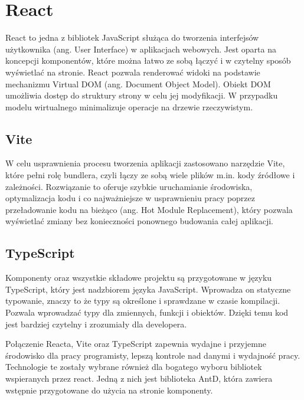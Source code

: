 \section{React}
React to jedna z bibliotek JavaScript służąca do tworzenia interfejsów użytkownika (ang. User Interface) w aplikacjach webowych. Jest oparta na koncepcji komponentów, które można łatwo ze sobą łączyć i w czytelny sposób wyświetlać na stronie. React pozwala renderować widoki na podstawie mechanizmu Virtual DOM (ang. Document Object Model). Obiekt DOM umożliwia dostęp do struktury strony w celu jej modyfikacji. W przypadku modelu wirtualnego minimalizuje operacje na drzewie rzeczywistym. 
\subsection*{Vite}
W celu usprawnienia procesu tworzenia aplikacji zastosowano narzędzie Vite, które pełni rolę bundlera, czyli łączy ze sobą wiele plików m.in. kody źródłowe i zależności. Rozwiązanie to oferuje szybkie uruchamianie środowiska, optymalizacja kodu i co najważniejsze w usprawnieniu pracy poprzez przeładowanie kodu na bieżąco (ang. Hot Module Replacement), który pozwala wyświetlać zmiany bez konieczności ponownego budowania całej aplikacji. 
\subsection*{TypeScript}
Komponenty oraz wszystkie składowe projektu są przygotowane w języku TypeScript, który jest nadzbiorem języka JavaScript. Wprowadza on statyczne typowanie, znaczy to że typy są określone i sprawdzane w czasie kompilacji. Pozwala wprowadzać typy dla zmiennych, funkcji i obiektów. Dzięki temu kod jest bardziej czytelny i zrozumiały dla developera. 
\newline

Połączenie Reacta, Vite oraz TypeScript zapewnia wydajne i przyjemne środowisko dla pracy programisty, lepszą kontrole nad danymi i wydajność pracy. Technologie te zostały wybrane również dla bogatego wyboru bibliotek wspieranych przez react. Jedną z nich jest biblioteka AntD, która zawiera wstępnie przygotowane do użycia na stronie komponenty. 


